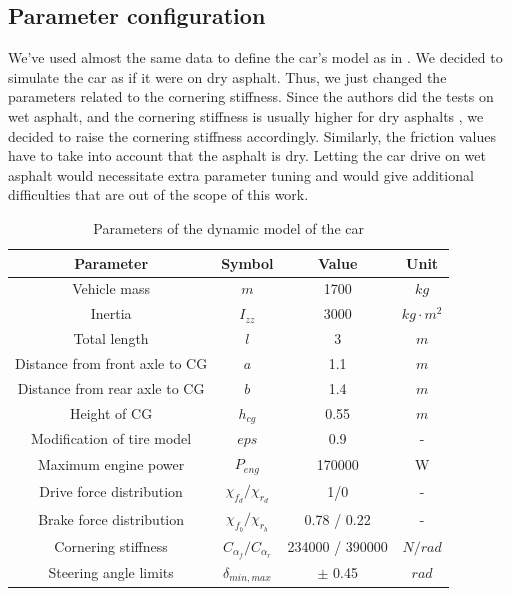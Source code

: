 \documentclass[a4paper, onecolumn, 12pt]{article}
\begin{document}
\subsection{Parameter configuration}

We've used almost the same data to define the car's model as in \cite{paper}. We
decided to simulate the car as if it were on dry asphalt. Thus, we just changed
the parameters related to the cornering stiffness. Since the authors did the
tests on wet asphalt, and the cornering stiffness is usually higher for dry
asphalts \cite{stiffness}, we decided to raise the cornering stiffness
accordingly. Similarly, the friction values have to take into account that the
asphalt is dry. Letting the car drive on wet asphalt would necessitate extra
parameter tuning and would give additional difficulties that are out of the
scope of this work.
\begin{table}[H]
    \centering
    \caption{Parameters of the dynamic model of the car} \label{params}
    \begin{tabular}{ |c|c|c|c| }
        \hline
        \textbf{Parameter} & \textbf{Symbol} & \textbf{Value} & \textbf{Unit} \\ [0.5ex] 
        \hline
        \hline 
        Vehicle mass & $m$ & 1700 & $kg$\\ 
        \hline
        Inertia & $I_{zz}$ & 3000 & $kg \cdot m^2$\\
        \hline
        Total length & $l$ & 3 & $m$\\
        \hline
        Distance from front axle to CG & $a$ & 1.1 & $m$\\
        \hline
        Distance from rear axle to CG & $b$ & 1.4 & $m$\\
        \hline
        Height of CG & $h_{cg}$ & 0.55 & $m$\\
        \hline
        Modification of tire model & $eps$ & 0.9 & -\\
        \hline
        Maximum engine power & $P_{eng}$ & 170000 & W \\
        \hline
        Drive force distribution & $\chi_{f_d} / \chi_{r_d}$ & 1/0 & -\\
        \hline
        Brake force distribution & $\chi_{f_b} / \chi_{r_b}$ & 0.78 / 0.22 & -\\
        \hline
        Cornering stiffness & $C_{\alpha_f} / C_{\alpha_r}$ & 234000 / 390000 & $N/rad$\\
        \hline
        Steering angle limits & $\delta_{min,max}$ & $\pm$ 0.45 & $rad$ \\
        \hline

    \end{tabular}
\end{table}
\end{document}
